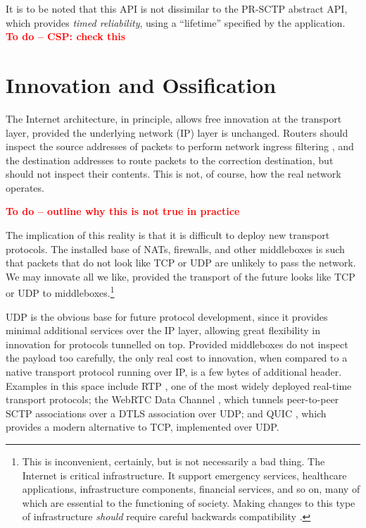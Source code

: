 \documentclass{sig-alternate-05-2015}
\newcommand{\todo}[1]{\textbf{\textcolor{red}{To do -- #1}}}
\begin{document}
It is to be noted that this API is not dissimilar to the PR-SCTP abstract
API, which provides \textit{timed reliability}, using a ``lifetime''
specified by the application. \todo{CSP: check this}

\section{Innovation and Ossification}
\label{sec:ossification}

The Internet architecture, in principle, allows free innovation at the
transport layer, provided the underlying network (IP) layer is unchanged.  
Routers should inspect the source addresses of packets to perform network
ingress filtering \cite{RFC2827}, and the destination addresses to route
packets to the correction destination, but should not inspect their
contents. This is not, of course, how the real network operates. 

\todo{outline why this is not true in practice}

The implication of this reality is that it is difficult to deploy new 
transport protocols. The installed base of NATs, firewalls, and other
middleboxes is such that packets that do not look like TCP or UDP are
unlikely to pass the network. We may innovate all we like, provided the
transport of the future looks like TCP or UDP to middleboxes.\footnote{
  This is inconvenient, certainly, but is not necessarily a bad thing. 
  The Internet is critical infrastructure. It support emergency services, 
  healthcare applications, infrastructure components, financial services, 
  and so on, many of which are essential to the functioning of society. 
  Making changes to this type of infrastructure \emph{should} require 
  careful backwards compatibility \cite{mcquistin:2015:reinterpreting}.
}

UDP is the obvious base for future protocol development, since it provides
minimal additional services over the IP layer, allowing great flexibility
in innovation for protocols tunnelled on top. Provided middleboxes do not
inspect the payload too carefully, the only real cost to innovation, when
compared to a native transport protocol running over IP, is a few bytes of
additional header. Examples in this space include RTP \cite{RFC3550}, one
of the most widely deployed real-time transport protocols; the WebRTC Data
Channel \cite{}, which tunnels peer-to-peer SCTP associations over a DTLS
association over UDP; and QUIC \cite{}, which provides a modern alternative 
to TCP, implemented over UDP. 
\end{document}
